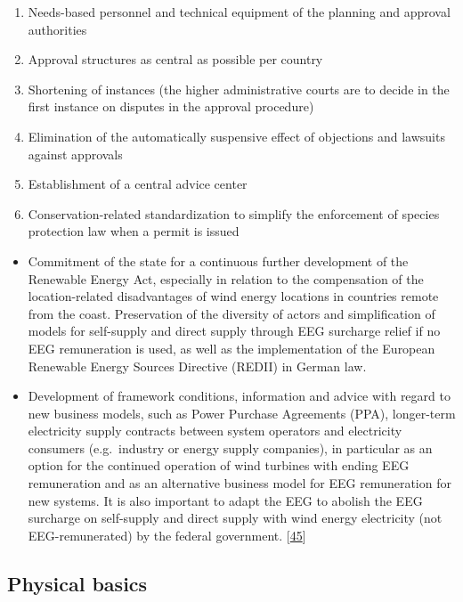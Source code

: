 \documentclass[a4paper,11pt]{article}
\providecommand{\tightlist}{%
  \setlength{\itemsep}{0pt}\setlength{\parskip}{0pt}}
\begin{document}
\begin{enumerate}
\def\labelenumi{\arabic{enumi}.}
\tightlist
\item
  Needs-based personnel and technical equipment of the planning and approval authorities
\item
  Approval structures as central as possible per country
\item
  Shortening of instances (the higher administrative courts are to decide in the first instance on disputes in the approval procedure)
\item
  Elimination of the automatically suspensive effect of objections and lawsuits against approvals
\item
  Establishment of a central advice center
\item
  Conservation-related standardization to simplify the enforcement of species protection law when a permit is issued
\end{enumerate}
\begin{itemize}
\item
  Commitment of the state for a continuous further development of the Renewable Energy Act, especially in relation to the compensation of the location-related disadvantages of wind energy locations in countries remote from the coast. Preservation of the diversity of actors and simplification of models for self-supply and direct supply through EEG surcharge relief if no EEG remuneration is used, as well as the implementation of the European Renewable Energy Sources Directive (REDII) in German law.
\item
  Development of framework conditions, information and advice with regard to new business models, such as Power Purchase Agreements (PPA), longer-term electricity supply contracts between system operators and electricity consumers (e.g.~industry or energy supply companies), in particular as an option for the continued operation of wind turbines with ending EEG remuneration and as an alternative business model for EEG remuneration for new systems. It is also important to adapt the EEG to abolish the EEG surcharge on self-supply and direct supply with wind energy electricity (not EEG-remunerated) by the federal government.
  {[}\protect\hyperlink{ref-MinisteriumfurUmweltEnergieErnahrungundForsten.2020}{45}{]}
\end{itemize}
\newpage

\hypertarget{physical-basics}{%
\subsection{Physical basics}\label{physical-basics}}
\end{document}
